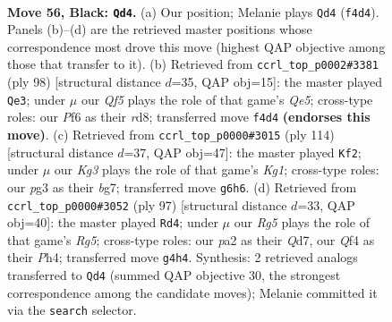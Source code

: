 \documentclass[11pt]{article}
\begin{document}
\clearpage

\begin{figure}[p]\centering
\begin{subfigure}{0.46\textwidth}\centering
\resizebox{\linewidth}{!}{%
\newchessgame
\chessboard[
  setfen={8/8/5pk1/3p4/5qr1/1Q4P1/P5KP/8 b - - 7 56},
  showmover=false,
  pgfstyle=straightmove, color=movearrow, markmove={f4-d4}
]}
\caption{}
\end{subfigure}\hfill
\begin{subfigure}{0.46\textwidth}\centering
\resizebox{\linewidth}{!}{%
\newchessgame
\chessboard[
  setfen={3r2k1/7p/4R1pq/4Qp2/5P2/6P1/6K1/8 w - - 5 50},
  showmover=false,
  pgfstyle=straightmove, color=movearrow, markmove={e5-e3}
]}
\caption{}
\end{subfigure}
\\[4pt]
\begin{subfigure}{0.46\textwidth}\centering
\resizebox{\linewidth}{!}{%
\newchessgame
\chessboard[
  setfen={8/3R2bk/6p1/7p/3Q4/3p3P/6P1/1q4K1 w - - 12 58},
  showmover=false,
  pgfstyle=straightmove, color=movearrow, markmove={g1-f2}
]}
\caption{}
\end{subfigure}\hfill
\begin{subfigure}{0.46\textwidth}\centering
\resizebox{\linewidth}{!}{%
\newchessgame
\chessboard[
  setfen={8/3q2k1/5p2/8/6rp/5QP1/5P2/4R1K1 b - - 3 49},
  showmover=false,
  pgfstyle=straightmove, color=movearrow, markmove={g4-d4}
]}
\caption{}
\end{subfigure}
\caption{\textbf{Move 56, Black: \texttt{Qd4}.} (a) Our position; Melanie plays \texttt{Qd4} (\texttt{f4d4}). Panels (b)--(d) are the retrieved master positions whose correspondence most drove this move (highest QAP objective among those that transfer to it). (b) Retrieved from \texttt{ccrl\_top\_p0002\#3381} (ply 98) [structural distance $d$=35, QAP obj=15]: the master played \texttt{Qe3}; under $\mu$ our \emph{Qf5} plays the role of that game's \emph{Qe5}; cross-type roles: our \emph{P}f6 as their \emph{r}d8; transferred move \texttt{f4d4} \textbf{(endorses this move)}. (c) Retrieved from \texttt{ccrl\_top\_p0000\#3015} (ply 114) [structural distance $d$=37, QAP obj=47]: the master played \texttt{Kf2}; under $\mu$ our \emph{Kg3} plays the role of that game's \emph{Kg1}; cross-type roles: our \emph{p}g3 as their \emph{b}g7; transferred move \texttt{g6h6}. (d) Retrieved from \texttt{ccrl\_top\_p0000\#3052} (ply 97) [structural distance $d$=33, QAP obj=40]: the master played \texttt{Rd4}; under $\mu$ our \emph{Rg5} plays the role of that game's \emph{Rg5}; cross-type roles: our \emph{p}a2 as their \emph{Q}d7, our \emph{Q}f4 as their \emph{P}h4; transferred move \texttt{g4h4}. Synthesis: 2 retrieved analogs transferred to \texttt{Qd4} (summed QAP objective 30, the strongest correspondence among the candidate moves); Melanie committed it via the \texttt{search} selector.}
\label{fig:thought-m111}
\end{figure}
\end{document}
